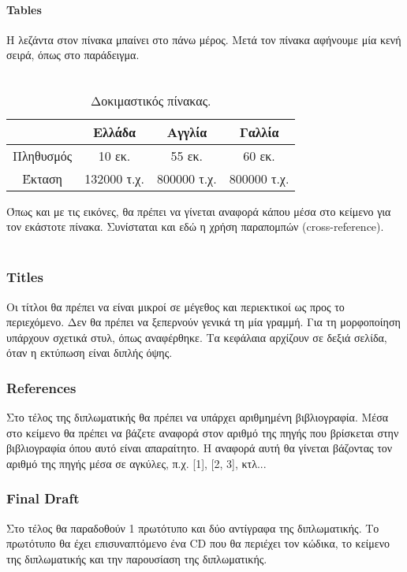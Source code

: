 \paragraph{Tables}

\begin{flushleft}
    Η λεζάντα στον πίνακα μπαίνει στο πάνω μέρος. Μετά τον πίνακα αφήνουμε μία κενή σειρά, όπως στο παράδειγμα.  \\~\\
    
    \begin{table}
        \centering
        \renewcommand\tablename{Πίνακας}
        \caption{\label{tab:table-name}Δοκιμαστικός πίνακας. }
        \begin{tabular}{|c|c|c|c|}
         \hline
          & Ελλάδα & Αγγλία & Γαλλία\\
         \hline\hline
         Πληθυσμός & 10 εκ.  & 55 εκ. & 60 εκ. \\ 
         \hline
         Έκταση & 132000 τ.χ. & 800000 τ.χ. & 800000 τ.χ. \\
         \hline
        \end{tabular}
    \end{table}
    
    Όπως και με τις εικόνες, θα πρέπει να γίνεται αναφορά κάπου μέσα στο κείμενο για τον εκάστοτε πίνακα. Συνίσταται και εδώ η χρήση παραπομπών (cross-reference). \\~\\
\end{flushleft}

\subsubsection{Titles}

\begin{flushleft}
    Οι τίτλοι θα πρέπει να είναι μικροί σε μέγεθος και περιεκτικοί ως προς το περιεχόμενο. Δεν θα πρέπει να ξεπερνούν γενικά τη μία γραμμή. Για τη μορφοποίηση υπάρχουν σχετικά στυλ, όπως αναφέρθηκε. Τα κεφάλαια αρχίζουν σε δεξιά σελίδα, όταν η εκτύπωση είναι διπλής όψης. 
\end{flushleft}

\subsubsection{References}

\begin{flushleft}
    Στο τέλος της διπλωματικής θα πρέπει να υπάρχει αριθμημένη βιβλιογραφία. Μέσα στο κείμενο θα πρέπει να βάζετε αναφορά στον αριθμό της πηγής που βρίσκεται στην βιβλιογραφία όπου αυτό είναι απαραίτητο. Η αναφορά αυτή θα γίνεται βάζοντας τον αριθμό της πηγής μέσα σε αγκύλες, π.χ. [1], [2, 3], κτλ... 
\end{flushleft}

\subsubsection{Final Draft}

\begin{flushleft}
    Στο τέλος θα παραδοθούν 1 πρωτότυπο και δύο αντίγραφα της διπλωματικής. Το πρωτότυπο θα έχει επισυναπτόμενο ένα CD που θα περιέχει τον κώδικα, το κείμενο της διπλωματικής και την παρουσίαση της διπλωματικής. 
\end{flushleft}